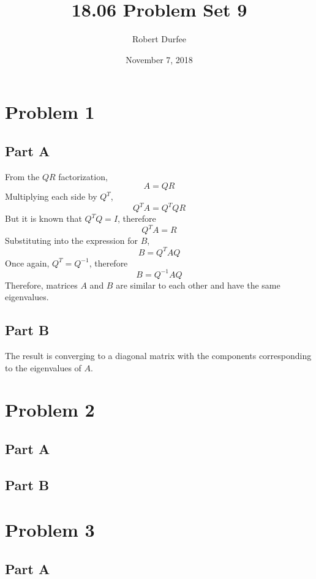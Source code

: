 \documentclass{article}
\title{18.06 Problem Set 9}
\author{Robert Durfee}
\date{November 7, 2018}
\begin{document}
\maketitle

\section*{Problem 1}

\subsection*{Part A}

From the $QR$ factorization,
$$ A = QR $$
Multiplying each side by $Q^T$,
$$ Q^T A = Q^T Q R $$
But it is known that $Q^T Q = I$, therefore
$$ Q^T A = R $$
Substituting into the expression for $B$,
$$ B = Q^T A Q $$
Once again, $Q^T = Q^{-1} $, therefore
$$ B = Q^{-1} A Q $$
Therefore, matrices $A$ and $B$ are similar to each other and have the same
eigenvalues.

\subsection*{Part B}

The result is converging to a diagonal matrix with the components
corresponding to the eigenvalues of $A$.

\section*{Problem 2}

\subsection*{Part A}

\subsection*{Part B}

\section*{Problem 3}

\subsection*{Part A}
\end{document}
